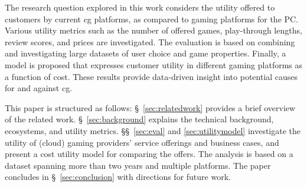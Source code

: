 The research question explored in this work considers the
utility offered to customers by current \gls{cg}
platforms, as compared to gaming platforms for the \acrshort{PC}.
Various utility metrics such as the number of offered games,
play-through lengths, review scores, and prices are investigated.
The evaluation is based on combining and investigating large
datasets of user choice and game properties.
Finally, a model is proposed that expresses customer utility
in different gaming platforms as a function of cost.
These results provide data-driven
insight into potential causes for and against \gls{cg}.

This paper is structured as follows: §~\ref{sec:relatedwork} provides a
brief overview of the related work. §~\ref{sec:background}
explains the technical background, ecosystems, and utility metrics.
§§~\ref{sec:eval} and \ref{sec:utilitymodel} investigate the utility of
(cloud) gaming providers' service offerings and business cases,
and present a cost utility model for comparing the offers.
The analysis is based on a dataset spanning more than two years and
multiple platforms.
The paper concludes in §~\ref{sec:conclusion} with
directions for future work.



